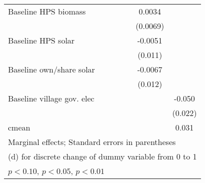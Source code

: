 \begin{table}[htbp]
\begin{tabular*}{1\hsize}{@{\hskip\tabcolsep\extracolsep\fill}l*{6}{c}}
Baseline HPS biomass&                  &                  &                  &                  &   0.0034         &                  \\
                &                  &                  &                  &                  & (0.0069)         &                  \\
Baseline HPS solar&                  &                  &                  &                  &  -0.0051         &                  \\
                &                  &                  &                  &                  &  (0.011)         &                  \\
Baseline own/share solar&                  &                  &                  &                  &  -0.0067         &                  \\
                &                  &                  &                  &                  &  (0.012)         &                  \\
Baseline village gov. elec&                  &                  &                  &                  &                  &   -0.050\sym{**} \\
                &                  &                  &                  &                  &                  &  (0.022)         \\
\midrule
cmean           &                  &                  &                  &                  &                  &    0.031         \\
\bottomrule
\multicolumn{7}{l}{\footnotesize Marginal effects; Standard errors in parentheses}\\
\multicolumn{7}{l}{\footnotesize  (d) for discrete change of dummy variable from 0 to 1}\\
\multicolumn{7}{l}{\footnotesize \sym{*} \(p<0.10\), \sym{**} \(p<0.05\), \sym{***} \(p<0.01\)}\\
\end{tabular*}
\end{table}
